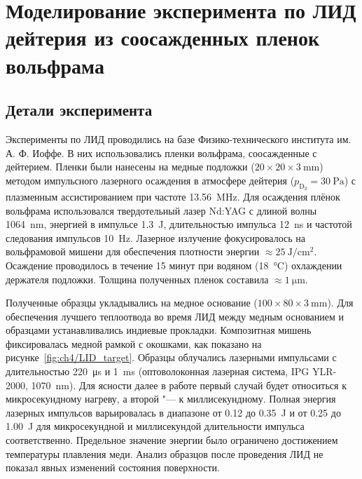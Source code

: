 \section{Моделирование эксперимента по ЛИД дейтерия из соосажденных пленок вольфрама}\label{sec:ch4/sec1}

\subsection{Детали эксперимента}\label{subsec:ch4/sec1/subsec1}

Эксперименты по ЛИД проводились на базе Физико-технического института им. А. Ф. Иоффе. В них использовались пленки вольфрама, соосажденные с дейтерием. Пленки были нанесены на медные подложки ($20 \times 20 \times \SI{3}{\milli\metre}$) методом импульсного лазерного осаждения в атмосфере дейтерия (\(p_\mathrm{D_2}=\SI{30}{\pascal}\)) с плазменным ассистированием при частоте \SI{13.56}{\mega\hertz}. Для осаждения плёнок вольфрама использовался твердотельный лазер Nd:YAG с длиной волны \SI{1064}{\nano\meter}, энергией в импульсе \SI{1.3}{\joule}, длительностью импульса \SI{12}{\nano\second} и частотой следования импульсов \SI{10}{\hertz}. Лазерное излучение фокусировалось на вольфрамовой мишени для обеспечения плотности энергии $\approx\SI{25}{\joule\per\centi\meter\squared}$. Осаждение проводилось в течение 15 минут при водяном (\SI{18}{\degreeCelsius}) охлаждении держателя подложки. Толщина полученных пленок составила $\approx\SI{1}{\micro\metre}$.

Полученные образцы укладывались на медное основание ($100 \times 80 \times \SI{3}{\milli\metre}$). Для обеспечения лучшего теплоотвода во время ЛИД между медным основанием и образцами устанавливались индиевые прокладки. Композитная мишень фиксировалась медной рамкой с окошками, как показано на рисунке~\cref{fig:ch4/LID_target}. Образцы облучались лазерными импульсами с длительностью \SI{220}{\micro\second} и \SI{1}{\milli\second} (оптоволоконная лазерная система, IPG YLR-2000, \SI{1070}{\nano\metre}). Для ясности далее в работе первый случай будет относиться к микросекундному нагреву, а второй "--- к миллисекундному. Полная энергия лазерных импульсов варьировалась в диапазоне от \num{0.12} до \SI{0.35}{\joule} и от \num{0.25} до \SI{1.00}{\joule} для микросекундной и миллисекундой длительности импульса соответственно. Предельное значение энергии было ограничено достижением температуры плавления меди. Анализ образцов после проведения ЛИД не показал явных изменений состояния поверхности.


